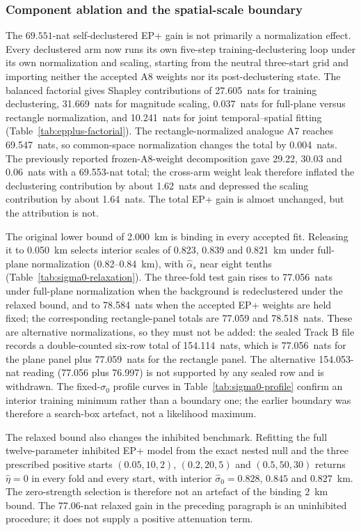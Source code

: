 \subsubsection{Component ablation and the spatial-scale boundary}\label{sec:epplus-ablation}
The $69.551$-nat self-declustered EP+ gain is not primarily a normalization effect. Every declustered arm now runs its own five-step training-declustering loop under its own normalization and scaling, starting from the neutral three-start grid and importing neither the accepted A8 weights nor its post-declustering state. The balanced factorial gives Shapley contributions of 27.605~nats for training declustering, 31.669~nats for magnitude scaling, 0.037~nats for full-plane versus rectangle normalization, and 10.241~nats for joint temporal--spatial fitting (Table~\ref{tab:epplus-factorial}). The rectangle-normalized analogue A7 reaches 69.547~nats, so common-space normalization changes the total by 0.004~nats. The previously reported frozen-A8-weight decomposition gave 29.22, 30.03 and 0.06~nats with a 69.553-nat total; the cross-arm weight leak therefore inflated the declustering contribution by about 1.62~nats and depressed the scaling contribution by about 1.64~nats. The total EP+ gain is almost unchanged, but the attribution is not.

The original lower bound of 2.000~km is binding in every accepted fit. Releasing it to 0.050~km selects interior scales of 0.823, 0.839 and 0.821~km under full-plane normalization (0.82--0.84~km), with $\widehat\alpha_s$ near eight tenths (Table~\ref{tab:sigma0-relaxation}). The three-fold test gain rises to 77.056~nats under full-plane normalization when the background is redeclustered under the relaxed bound, and to 78.584~nats when the accepted EP+ weights are held fixed; the corresponding rectangle-panel totals are 77.059 and 78.518~nats. These are alternative normalizations, so they must not be added: the sealed Track B file records a double-counted six-row total of 154.114~nats, which is 77.056~nats for the plane panel plus 77.059~nats for the rectangle panel. The alternative 154.053-nat reading (77.056 plus 76.997) is not supported by any sealed row and is withdrawn. The fixed-$\sigma_0$ profile curves in Table~\ref{tab:sigma0-profile} confirm an interior training minimum rather than a boundary one; the earlier boundary was therefore a search-box artefact, not a likelihood maximum.

The relaxed bound also changes the inhibited benchmark. Refitting the full twelve-parameter inhibited EP+ model from the exact nested null and the three prescribed positive starts $(0.05,10,2)$, $(0.2,20,5)$ and $(0.5,50,30)$ returns $\hat\eta=0$ in every fold and every start, with interior $\hat\sigma_0=0.828$, $0.845$ and $0.827$~km. The zero-strength selection is therefore not an artefact of the binding $2$~km bound. The 77.06-nat relaxed gain in the preceding paragraph is an uninhibited procedure; it does not supply a positive attenuation term.

